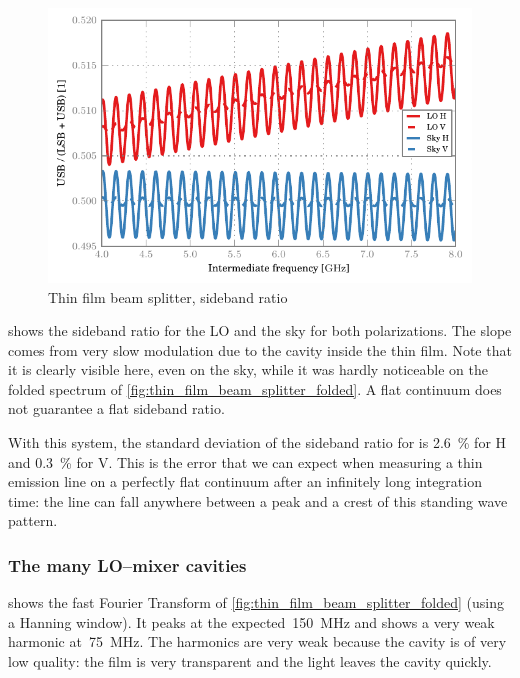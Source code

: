 \begin{figure}[hbtp]
    \centering
    \includegraphics{thin_film_beam_splitter_sbr}
    \caption{Thin film beam splitter, sideband ratio}
    \label{fig:thin_film_beam_splitter_sbr}
\end{figure}
 shows the sideband ratio for the LO and the sky for both polarizations.
The slope comes from very slow modulation due to the cavity inside the thin film.
Note that it is clearly visible here, even on the sky, while it was hardly noticeable on the folded spectrum of \cref{fig:thin_film_beam_splitter_folded}.
A flat continuum does not guarantee a flat sideband ratio.

With this system, the standard deviation of the sideband ratio for is \SI{2.6}{\percent} for H and \SI{0.3}{\percent} for V.
This is the error that we can expect when measuring a thin emission line on a perfectly flat continuum after an infinitely long integration time: the line can fall anywhere between a peak and a crest of this standing wave pattern.

\subsubsection{The many LO--mixer cavities}

 shows
the fast Fourier Transform of \cref{fig:thin_film_beam_splitter_folded} (using a Hanning window).
It peaks at the expected~\SI{150}{\mega\hertz} and shows a very weak harmonic at~\SI{75}{\mega\hertz}.
The harmonics are very weak because the cavity is of very low quality: the film is very transparent and the light leaves the cavity quickly.

